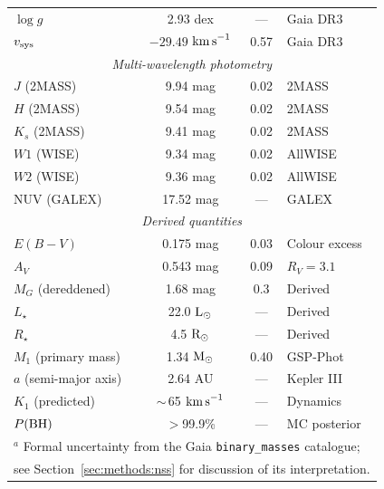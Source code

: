 \documentclass[usenatbib,fleqn]{mnras}
\newcommand{\Msun}{{\rm M}_\odot}
\newcommand{\Lsun}{{\rm L}_\odot}
\newcommand{\Rsun}{{\rm R}_\odot}
\newcommand{\kms}{{\rm km\,s}^{-1}}
\begin{document}
\begin{table}
\begin{tabular}{lccl}
$\log g$               & 2.93 dex            & ---      & Gaia DR3 \\
$v_{\rm sys}$          & $-29.49$ $\kms$     & 0.57     & Gaia DR3 \\
\midrule
\multicolumn{4}{c}{\textit{Multi-wavelength photometry}} \\
$J$ (2MASS)            & 9.94 mag            & 0.02     & 2MASS \\
$H$ (2MASS)            & 9.54 mag            & 0.02     & 2MASS \\
$K_s$ (2MASS)          & 9.41 mag            & 0.02     & 2MASS \\
$W1$ (WISE)            & 9.34 mag            & 0.02     & AllWISE \\
$W2$ (WISE)            & 9.36 mag            & 0.02     & AllWISE \\
NUV (GALEX)            & 17.52 mag           & ---      & GALEX \\
\midrule
\multicolumn{4}{c}{\textit{Derived quantities}} \\
$E(B-V)$               & 0.175 mag           & 0.03     & Colour excess \\
$A_V$                  & 0.543 mag           & 0.09     & $R_V = 3.1$ \\
$M_G$ (dereddened)     & 1.68 mag            & 0.3      & Derived \\
$L_\star$              & 22.0 $\Lsun$        & ---      & Derived \\
$R_\star$              & 4.5 $\Rsun$         & ---      & Derived \\
$M_1$ (primary mass)   & 1.34 $\Msun$        & 0.40     & GSP-Phot \\
$a$ (semi-major axis)  & 2.64 AU             & ---      & Kepler III \\
$K_1$ (predicted)      & $\sim$\,65 $\kms$   & ---      & Dynamics \\
$P({\rm BH})$          & $>$99.9\%           & ---      & MC posterior \\
\bottomrule
\multicolumn{4}{l}{$^a$ Formal uncertainty from the Gaia \texttt{binary\_masses} catalogue;}\\
\multicolumn{4}{l}{\phantom{$^a$} see Section~\ref{sec:methods:nss} for discussion of its interpretation.}\\
\end{tabular}
\end{table}
\end{document}
